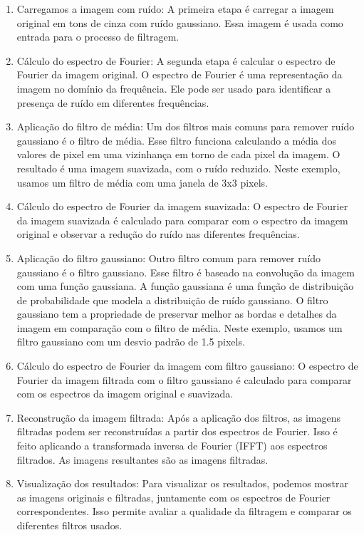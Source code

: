 \documentclass[10pt,a4paper]{article}
\begin{document}
\begin{enumerate}
    \item Carregamos a imagem com ruído: A primeira etapa é carregar a imagem original em tons de cinza com ruído gaussiano. Essa imagem é usada como entrada para o processo de filtragem.
    \item Cálculo do espectro de Fourier: A segunda etapa é calcular o espectro de Fourier da imagem original. O espectro de Fourier é uma representação da imagem no domínio da frequência. Ele pode ser usado para identificar a presença de ruído em diferentes frequências.
    \item Aplicação do filtro de média: Um dos filtros mais comuns para remover ruído gaussiano é o filtro de média. Esse filtro funciona calculando a média dos valores de pixel em uma vizinhança em torno de cada pixel da imagem. O resultado é uma imagem suavizada, com o ruído reduzido. Neste exemplo, usamos um filtro de média com uma janela de 3x3 pixels.
    \item Cálculo do espectro de Fourier da imagem suavizada: O espectro de Fourier da imagem suavizada é calculado para comparar com o espectro da imagem original e observar a redução do ruído nas diferentes frequências.
    \item Aplicação do filtro gaussiano: Outro filtro comum para remover ruído gaussiano é o filtro gaussiano. Esse filtro é baseado na convolução da imagem com uma função gaussiana. A função gaussiana é uma função de distribuição de probabilidade que modela a distribuição de ruído gaussiano. O filtro gaussiano tem a propriedade de preservar melhor as bordas e detalhes da imagem em comparação com o filtro de média. Neste exemplo, usamos um filtro gaussiano com um desvio padrão de 1.5 pixels.
    \item Cálculo do espectro de Fourier da imagem com filtro gaussiano: O espectro de Fourier da imagem filtrada com o filtro gaussiano é calculado para comparar com os espectros da imagem original e suavizada.
    \item Reconstrução da imagem filtrada: Após a aplicação dos filtros, as imagens filtradas podem ser reconstruídas a partir dos espectros de Fourier. Isso é feito aplicando a transformada inversa de Fourier (IFFT) aos espectros filtrados. As imagens resultantes são as imagens filtradas. 
    \item Visualização dos resultados: Para visualizar os resultados, podemos mostrar as imagens originais e filtradas, juntamente com os espectros de Fourier correspondentes. Isso permite avaliar a qualidade da filtragem e comparar os diferentes filtros usados.
\end{enumerate}
\end{document}
